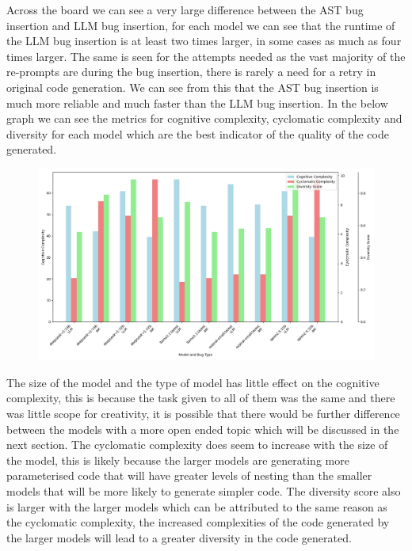 \documentclass[12pt]{extarticle}
\begin{document}
Across the board we can see a very large difference between the AST bug insertion and LLM bug insertion, for each model we can see that the runtime of the LLM bug insertion is at least two times larger, in some cases as much as four times larger. The same is seen for the attempts needed as the vast majority of the re-prompts are during the bug insertion, there is rarely a need for a retry in original code generation. We can see from this that the AST bug insertion is much more reliable and much faster than the LLM bug insertion. In the below graph we can see the metrics for cognitive complexity, cyclomatic complexity and diversity for each model which are the best indicator of the quality of the code generated.

\begin{figure}[h!]
\centering
\includegraphics[width=\linewidth]{Images/Complexity_Comparison_Fibbonaci.png}
\label{fig:Complexity_Benchmark}
\end{figure}

The size of the model and the type of model has little effect on the cognitive complexity, this is because the task given to all of them was the same and there was little scope for creativity, it is possible that there would be further difference between the models with a more open ended topic which will be discussed in the next section. The cyclomatic complexity does seem to increase with the size of the model, this is likely because the larger models are generating more parameterised code that will have greater levels of nesting than the smaller models that will be more likely to generate simpler code. The diversity score also is larger with the larger models which can be attributed to the same reason as the cyclomatic complexity, the increased complexities of the code generated by the larger models will lead to a greater diversity in the code generated.
\end{document}
